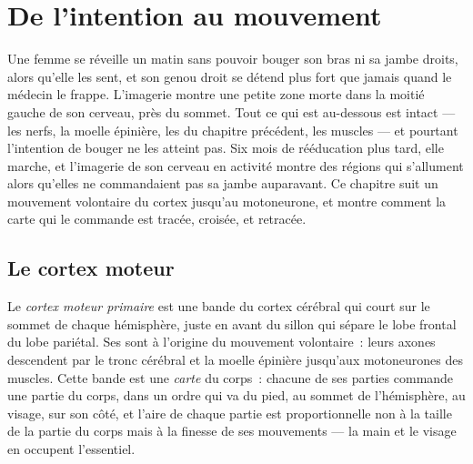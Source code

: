 \chapter{De l'intention au mouvement}\label{ch:g12:brain-and-movement}

Une femme se réveille un matin sans pouvoir bouger son bras ni sa
jambe droits, alors qu'elle les sent, et son genou droit se détend
plus fort que jamais quand le médecin le frappe. L'imagerie montre une
petite zone morte dans la moitié gauche de son cerveau, près du
sommet. Tout ce qui est au-dessous est intact --- les nerfs, la moelle
épinière, les  du chapitre précédent, les muscles --- et
pourtant l'intention de bouger ne les atteint pas. Six mois de
rééducation plus tard, elle marche, et l'imagerie de son cerveau en
activité montre des régions qui s'allument alors qu'elles ne
commandaient pas sa jambe auparavant. Ce chapitre suit un mouvement
volontaire du cortex jusqu'au motoneurone, et montre comment la carte
qui le commande est tracée, croisée, et retracée.

\section{Le cortex moteur}

\begin{definition}\label{def:g12:brain-and-movement:cortex}
Le \emph{cortex moteur primaire} est une bande du
cortex cérébral qui court sur le sommet de chaque hémisphère, juste en
avant du sillon qui sépare le lobe frontal du lobe pariétal. Ses
 sont à l'origine du mouvement volontaire~: leurs axones
descendent par le tronc cérébral et la moelle épinière jusqu'aux
motoneurones des muscles. Cette bande est une \emph{carte} du corps~:
chacune de ses parties commande une partie du corps, dans un ordre qui
va du pied, au sommet de l'hémisphère, au visage, sur son côté, et
l'aire de chaque partie est proportionnelle non à la taille de la
partie du corps mais à la finesse de ses mouvements --- la main et le
visage en occupent l'essentiel.
\end{definition}


